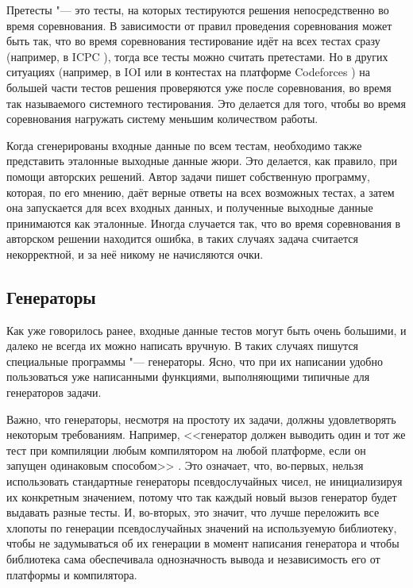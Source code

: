 Претесты "--- это тесты, на которых тестируются решения непосредственно во время соревнования. В зависимости от правил проведения соревнования может быть так, что во время соревнования тестирование идёт на всех тестах сразу (например, в ICPC \cite{icpc}), тогда все тесты можно считать претестами. Но в других ситуациях (например, в IOI \cite{ioi} или в контестах на платформе Codeforces \cite{codeforces}) на большей части тестов решения проверяются уже после соревнования, во время так называемого системного тестирования. Это делается для того, чтобы во время соревнования нагружать систему меньшим количеством работы.

Когда сгенерированы входные данные по всем тестам, необходимо также представить эталонные выходные данные жюри. Это делается, как правило, при помощи авторских решений. Автор задачи пишет собственную программу, которая, по его мнению, даёт верные ответы на всех возможных тестах, а затем она запускается для всех входных данных, и полученные выходные данные принимаются как эталонные. Иногда случается так, что во время соревнования в авторском решении находится ошибка, в таких случаях задача считается некорректной, и за неё никому не начисляются очки.

\subsection{Генераторы}

Как уже говорилось ранее, входные данные тестов могут быть очень большими, и далеко не всегда их можно написать вручную. В таких случаях пишутся специальные программы "--- генераторы. Ясно, что при их написании удобно пользоваться уже написанными функциями, выполняющими типичные для генераторов задачи.

Важно, что генераторы, несмотря на простоту их задачи, должны удовлетворять некоторым требованиям. Например, <<генератор должен выводить один и тот же тест при компиляции любым компилятором на любой платформе, если он запущен одинаковым способом>> \cite{testlib}. Это означает, что, во-первых, нельзя использовать стандартные генераторы псевдослучайных чисел, не инициализируя их конкретным значением, потому что так каждый новый вызов генератор будет выдавать разные тесты. И, во-вторых, это значит, что лучше переложить все хлопоты по генерации псевдослучайных значений на используемую библиотеку, чтобы не задумываться об их генерации в момент написания генератора и чтобы библиотека сама обеспечивала однозначность вывода и независимость его от платформы и компилятора.

